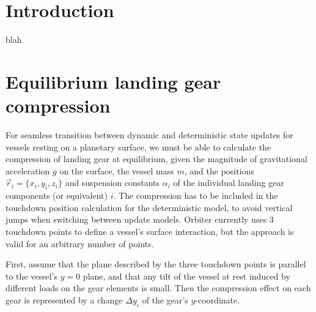 \documentclass{article}
\begin{document}


\newcommand{\ACC}{\ensuremath\mathrm{A}}
\newcommand{\AACC}{\ensuremath\mathrm{T}}
\newcommand{\Euler}{\ensuremath\mathrm{E}}


\newcommand{\vR}[1]{\ensuremath{\vec{R}_{#1}}}
\newcommand{\nR}[1]{\ensuremath{|\vR{#1}|}}

\maketitle

\section{Introduction}
blah

\section{Equilibrium landing gear compression}\label{sec:equi_comp}
For seamless transition between dynamic and deterministic state updates for vessels resting on a planetary surface, we must be able to calculate the compression of landing gear at equilibrium, given the magnitude of gravitational acceleration $g$ on the surface, the vessel mass $m$, and the positions $\vec{r}_i = \lbrace x_i, y_i, z_i\rbrace$ and suspension constants $\alpha_i$ of the individual landing gear components (or equivalent) $i$. The compression has to be included in the touchdown position calculation for the deterministic model, to avoid vertical jumps when switching between update models. Orbiter currently uses 3 touchdown points to define a vessel's surface interaction, but the approach is valid for an arbitrary number of points.

First, assume that the plane described by the three touchdown points is parallel to the vessel's $y=0$ plane, and that any tilt of the vessel at rest induced by different loads on the gear elements is small. Then the compression effect on each gear is represented by a change $\Delta y_i$ of the gear's $y$-coordinate.
\end{document}
